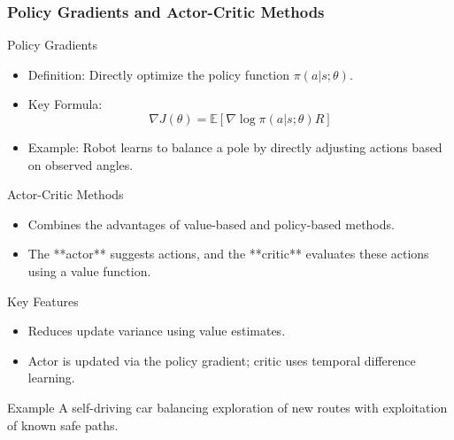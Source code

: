 \documentclass{beamer}
\begin{document}
\begin{frame}[fragile]
    \frametitle{Policy Gradients and Actor-Critic Methods}
    \begin{block}{Policy Gradients}
        \begin{itemize}
            \item Definition: Directly optimize the policy function $\pi(a|s;\theta)$.
            \item Key Formula:
            \begin{equation}
                \nabla J(\theta) = \mathbb{E} \left[ \nabla \log \pi(a|s;\theta) R \right]
            \end{equation}
            \item Example: Robot learns to balance a pole by directly adjusting actions based on observed angles.
        \end{itemize}
    \end{block}

    \begin{block}{Actor-Critic Methods}
        \begin{itemize}
            \item Combines the advantages of value-based and policy-based methods.
            \item The **actor** suggests actions, and the **critic** evaluates these actions using a value function.
        \end{itemize}
    \end{block}

    \begin{block}{Key Features}
        \begin{itemize}
            \item Reduces update variance using value estimates.
            \item Actor is updated via the policy gradient; critic uses temporal difference learning.
        \end{itemize}
    \end{block}

    \begin{block}{Example}
        A self-driving car balancing exploration of new routes with exploitation of known safe paths.
    \end{block}
\end{frame}
\end{document}
